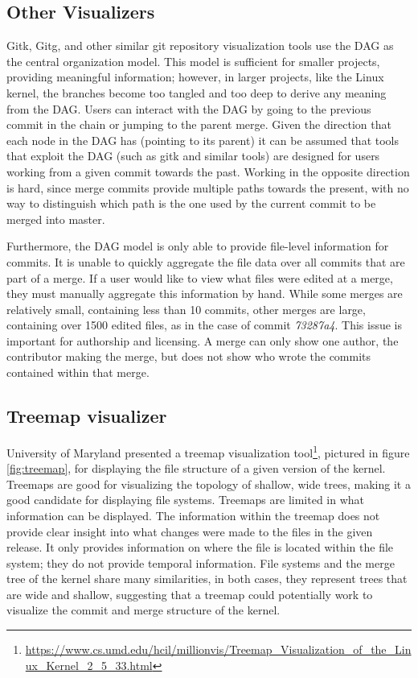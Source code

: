 \documentclass[conference, draftclsnofoot, draft]{IEEEtran}
\begin{document}
\subsection{Other Visualizers}

Gitk, Gitg, and other similar git repository visualization tools use the DAG as the
central organization model. This model is sufficient for smaller projects, providing
meaningful information; however, in larger projects, like the Linux kernel, the
branches become too tangled and too deep to derive any meaning from the DAG. Users
can interact with the DAG by going to the previous commit in the chain or jumping to
the parent merge. Given the direction that each node in the DAG has (pointing to its parent)
it can be assumed that tools that exploit the DAG (such as gitk and similar tools) are designed for users
working from a given commit towards the past. Working in the opposite direction is hard, since merge commits provide multiple paths towards the present, with no
way to distinguish which path is the one used by the current commit to be merged into master.

Furthermore, the DAG model is only able to provide file-level information for
commits. It is unable to quickly aggregate the file data over all commits that
are part of a merge. If a user would like to view what files were edited at a merge,
they must manually aggregate this information by hand. While some merges are
relatively small, containing less than 10 commits, other merges are large,
containing over 1500 edited files, as in the case of commit \textit{73287a4}. This
issue is important for authorship and licensing. A merge can only show one author,
the contributor making the merge, but does not show who wrote the commits contained
within that merge.



\subsection{Treemap visualizer}

University of Maryland presented a treemap visualization
tool\footnote{\url{https://www.cs.umd.edu/hcil/millionvis/Treemap_Visualization_of_the_Linux_Kernel_2_5_33.html}},
pictured in figure \ref{fig:treemap}, for displaying the file structure of a given
version of the kernel. Treemaps are good for visualizing the topology of shallow,
wide trees, making it a good candidate for displaying file systems. Treemaps are
limited in what information can be displayed. The information within the treemap
does not provide clear insight into what changes were made to the files in the given
release. It only provides information on where the file is located within the file
system; they do not provide temporal information. File systems and the merge
tree of the kernel share many similarities, in both cases, they represent trees that
are wide and shallow, suggesting that a treemap could potentially work to visualize
the commit and merge structure of the kernel.
\end{document}
